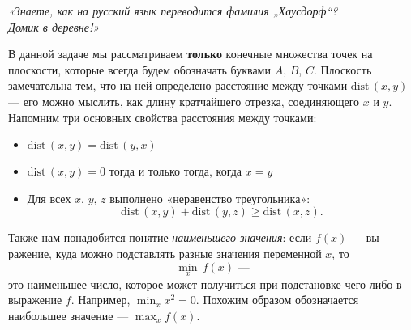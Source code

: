 ﻿%
{}
\def\dist{\mathrm{dist}\,} \def\l#1{\limits_{#1}}
\def\Dist{\mathrm{DIST}\,}

\begin{flushright} \itshape
	«Знаете, как на русский язык переводится фамилия „Хаусдорф“? \\
	Домик в деревне!»
\end{flushright}

\ms В данной задаче мы рассматриваем {\bfseries только} конечные множества точек на плоскости, которые всегда будем обозначать буквами $A$, $B$, $C$. Плоскость замечательна тем, что на ней определено расстояние между точками $\dist (x,y)$ — его можно мыслить, как длину кратчайшего отрезка, соединяющего $x$ и $y$. Напомним три основных свойства расстояния между точками:

\vspace{-0.15cm}
\begin{itemize}
	\item $\dist (x,y) = \dist (y,x)$\scolon
	\item $\dist (x,y) = 0$ тогда и только тогда, когда $x=y$\scolon
	\item Для всех $x$, $y$, $z$ выполнено «неравенство треугольника»:
		\vspace{-0.2cm} $$\dist (x,y) + \dist (y,z) \geq \dist (x,z).$$
\end{itemize}

\vspace{-0.4cm}
\ms Также нам понадобится понятие {\itshape наименьшего значения}: если $f(x)$ — вы- ражение, куда можно подставлять разные значения переменной $x$, то
	$$\min_x\,f(x)\text{\ \ —}$$
это наименьшее число, которое может получиться при подстановке чего-либо в выражение $f$. Например, $\min_x x^2 = 0$. Похожим образом обозначается наибольшее значение — $\max_x f(x)$.


